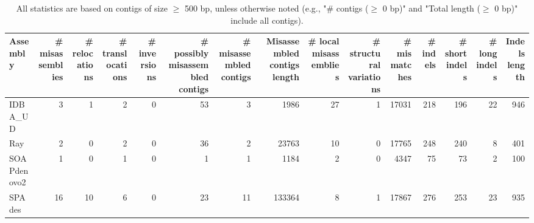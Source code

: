 \documentclass[12pt,a4paper]{article}
\begin{document}
\begin{table}[ht]
\begin{center}
\caption{All statistics are based on contigs of size $\geq$ 500 bp, unless otherwise noted (e.g., "\# contigs ($\geq$ 0 bp)" and "Total length ($\geq$ 0 bp)" include all contigs).}
\begin{tabular}{|l*{14}{|r}|}
\hline
Assembly & \# misassemblies &     \# relocations &     \# translocations &     \# inversions & \# possibly misassembled contigs & \# misassembled contigs & Misassembled contigs length & \# local misassemblies & \# structural variations & \# mismatches & \# indels &     \# short indels &     \# long indels & Indels length \\ \hline
IDBA\_UD & 3 & 1 & 2 & 0 & 53 & 3 & 1986 & 27 & 1 & 17031 & 218 & 196 & 22 & 946 \\ \hline
Ray & 2 & 0 & 2 & 0 & 36 & 2 & 23763 & 10 & 0 & 17765 & 248 & 240 & 8 & 401 \\ \hline
SOAPdenovo2 & 1 & 0 & 1 & 0 & 1 & 1 & 1184 & 2 & 0 & 4347 & 75 & 73 & 2 & 100 \\ \hline
SPAdes & 16 & 10 & 6 & 0 & 23 & 11 & 133364 & 8 & 1 & 17867 & 276 & 253 & 23 & 935 \\ \hline
\end{tabular}
\end{center}
\end{table}
\end{document}
